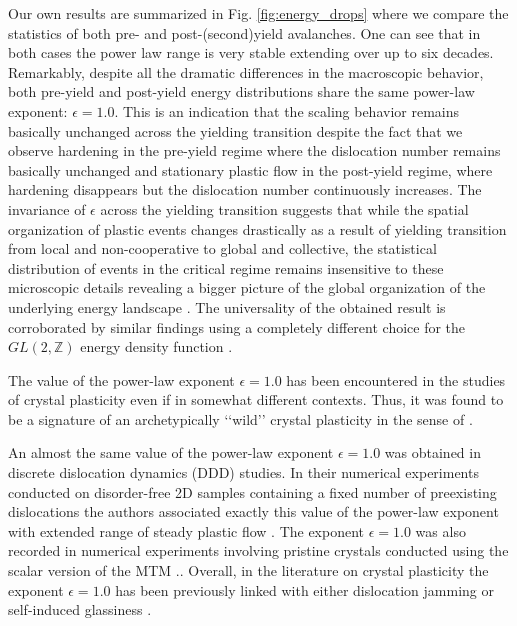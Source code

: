 \documentclass[aps,
superscriptaddress,notitlepage]{revtex4-1}
\begin{document}
Our own results are summarized  in Fig. \ref{fig:energy_drops} where we compare the statistics of  both pre- and post-(second)yield  avalanches.  One can see  that in both cases the power law range is very stable extending over up to six decades. Remarkably, despite all the dramatic differences in the macroscopic behavior, both pre-yield and post-yield energy distributions share the same power-law exponent: $\epsilon = 1.0$. This is an indication that  the  scaling behavior  remains basically unchanged across the  yielding transition despite the fact that we observe  hardening in the pre-yield regime where the dislocation number remains basically unchanged and stationary plastic flow in the post-yield regime,  where hardening disappears but  the dislocation number continuously increases. 
 The invariance of $\epsilon$ across the yielding transition  suggests that while the spatial organization of plastic events changes drastically as a result of   yielding transition from local and non-cooperative to global and collective, the statistical distribution of   events in the critical regime  remains insensitive to these microscopic details revealing a bigger picture of the global  organization of the underlying energy landscape \cite{Shang2020,oyama2021-rf}.
The universality of the obtained result is corroborated by similar findings using a completely different choice for the $GL(2, \mathbb{Z})$ energy density function \cite{perchikov2024}.


The value of the power-law exponent $\epsilon = 1.0$ has been encountered in the studies of crystal plasticity even if in somewhat  different contexts. Thus, it was found to be  a signature of an archetypically ‘‘wild’’ crystal plasticity in the sense of   \cite{Weiss2015-eh}.

An almost the same value of the power-law exponent $\epsilon = 1.0$  was obtained in discrete dislocation dynamics (DDD) studies.  In their numerical experiments conducted on disorder-free 2D samples containing a fixed number of preexisting dislocations the authors associated exactly  this value of the power-law exponent with extended  range of steady plastic flow \cite{Ispanovity2014-ra,PhysRevMaterials.5.073601}. The exponent $\epsilon = 1.0$  was also recorded in numerical experiments involving pristine crystals conducted using the scalar version of the MTM .\cite{Zhang2020-ax}. Overall,  in the literature on crystal plasticity the exponent $\epsilon = 1.0$  has been previously  linked with either dislocation jamming or self-induced glassiness  \cite{Ovaska2015-yb,Lehtinen2016-qy,Zhang2016-gh,Ruscher2019-us}.
\end{document}
